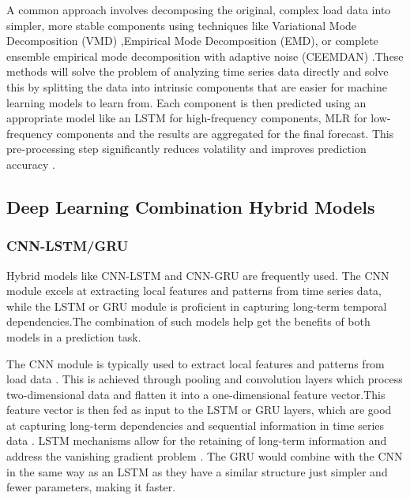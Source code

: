 A common approach involves decomposing the original, complex load data into simpler, more stable components using techniques like Variational Mode Decomposition (VMD) \cite{he2019hybrid},Empirical Mode Decomposition (EMD), or complete ensemble empirical mode decomposition with adaptive noise (CEEMDAN) \cite{hiceemdanQteg}.These methods will solve the problem of analyzing time series data directly and solve this by splitting the data into intrinsic components that are easier for machine learning models to learn from. Each component is then predicted using an appropriate model like an LSTM for high-frequency components, MLR for low-frequency components \cite{huang2023two} and the results are aggregated for the final forecast. This pre-processing step significantly reduces volatility and improves prediction accuracy \cite{wang2023short}.

\subsection{Deep Learning Combination Hybrid Models}
  
 \subsubsection{CNN-LSTM/GRU}
 
  Hybrid models like CNN-LSTM and CNN-GRU are frequently used. The CNN module excels at extracting local features and patterns from time series data, while the LSTM or GRU module is proficient in capturing long-term temporal dependencies\cite{zhu2025novel}.The combination of such models help get the benefits of both models in a prediction task.
  
  The CNN module is typically used to extract local features and patterns from load data \cite{wu2020short}. This is achieved through pooling and convolution layers which process two-dimensional data and flatten it into a one-dimensional feature vector.This feature vector is then fed as input to the LSTM or GRU layers, which are good at capturing long-term dependencies and sequential information in time series data \cite{zhu2025novel}. LSTM mechanisms allow for the retaining of long-term information and address the vanishing gradient problem \cite{zhu2025novel}. The GRU would combine with the CNN in the same way as an LSTM as they have a similar structure just simpler and fewer parameters, making it faster\cite{wang2018short}.
  
